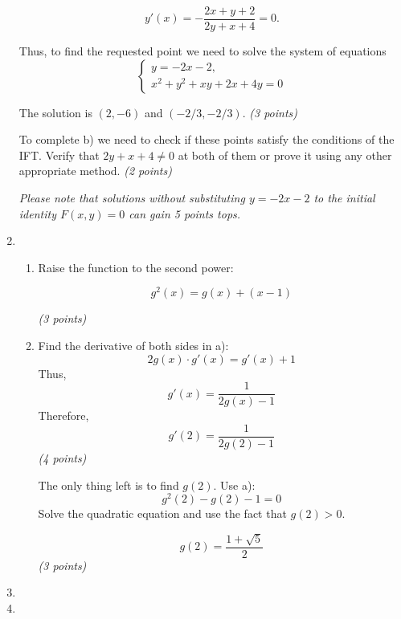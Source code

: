 \begin{enumerate}
    \[
      y'(x) = -\frac{2x+y+2}{2y+x+4} = 0.
    \] 
    
    Thus, to find the requested point we need to solve the system of equations 
    \[
    \begin{cases}
        y = -2x-2,\\
        x^2+y^2+xy+2x+4y = 0
    \end{cases}
    \]

The solution is $(2,-6)$ and $(-2/3,-2/3).$ \textit{(3 points)}

To complete b) we need to check if these points satisfy the conditions of the IFT. 
Verify that $2y + x +4 \neq 0$ at both of them or prove it using any other appropriate method. \textit{(2 points)} 
    
\textit{Please note that solutions without substituting $y = -2x-2$ to the initial identity $F(x,y) = 0$ can gain 5 points tops.}

\item

\begin{enumerate}
    \item Raise the function to the second power:
    
    \[
        g^2(x) = g(x) + (x-1)
    \]
    
    \textit{(3 points)}

    
    \item Find the derivative of both sides in a):
    \[
        2g(x)\cdot g'(x) = g'(x) + 1
    \]
    Thus, 
    \[
      g'(x) = \frac{1}{2g(x)-1}
    \]
    Therefore,
    \[
      g'(2) = \frac{1}{2g(2)-1}
    \]
    \textit{(4 points)}
    
    The only thing left is to find $g(2)$. Use a):
    \[
    g^2(2) - g(2) - 1 = 0
    \]
    Solve the quadratic equation and use the fact that $g(2) >0$.
    
    \[
      g(2) = \frac{1+\sqrt{5}}{2}
    \]
    \textit{(3 points)}
\end{enumerate}
    

    \item 
    \item 
\end{enumerate}
